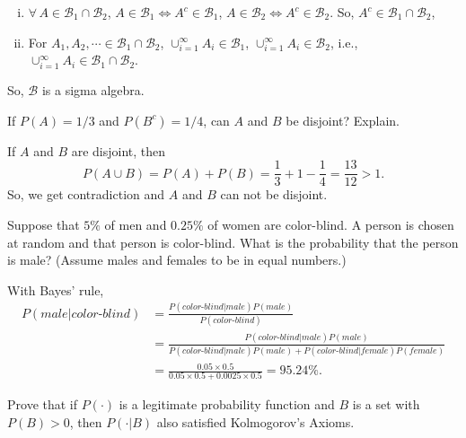 \documentclass[14pt]{elegantbook}
\begin{document}
\begin{solution}
\begin{enumerate}[(a)]
\begin{enumerate}[(i)]
                \item $\forall\,A\in\mathcal{B}_1\cap\mathcal{B}_2$, $A\in\mathcal{B}_1\Leftrightarrow A^c\in\mathcal{B}_1$, $A\in\mathcal{B}_2\Leftrightarrow A^c\in\mathcal{B}_2$. So, $A^c\in\mathcal{B}_1\cap\mathcal{B}_2$, 
                \item For $A_1, A_2, \cdots \in\mathcal{B}_1\cap\mathcal{B}_2$, $\cup_{i=1}^\infty A_i\in\mathcal{B}_1$, $\cup_{i=1}^\infty A_i\in\mathcal{B}_2$, i.e., $\cup_{i=1}^\infty A_i\in\mathcal{B}_1\cap\mathcal{B}_2$. 
            \end{enumerate}
            So, $\mathcal{B}$ is a sigma algebra. 
        \end{enumerate}
    \end{solution}

    \setcounter{exer}{12}
    \begin{exercise}
        If $P(A)=1/3$ and $P(B^c)=1/4$, can $A$ and $B$ be disjoint? Explain. 
    \end{exercise}

    \begin{solution}
        If $A$ and $B$ are disjoint, then
        \[P(A\cup B)=P(A)+P(B)=\frac{1}{3}+1-\frac{1}{4}=\frac{13}{12}>1. \]
        So, we get contradiction and $A$ and $B$ can not be disjoint. 
    \end{solution}

    \setcounter{exer}{32}
    \begin{exercise}
        Suppose that $5\%$ of men and $0.25\%$ of women are color-blind. A person is chosen at random and that person is color-blind. What is the probability that the person is male? (Assume males and females to be in equal numbers.)
    \end{exercise}

    \begin{solution}
        With Bayes' rule, 
        \begin{align*}
            P(male|color\text{-}blind)&=\frac{P(color\text{-}blind|male)P(male)}{P(color\text{-}blind)}\\
            &=\frac{P(color\text{-}blind|male)P(male)}{P(color\text{-}blind|male)P(male)+P(color\text{-}blind|female)P(female)}\\
            &=\frac{0.05\times0.5}{0.05\times0.5+0.0025\times0.5}=95.24\%.
        \end{align*}
    \end{solution}

    \setcounter{exer}{34}
    \begin{exercise}
        Prove that if $P(\cdot)$ is a legitimate probability function and $B$ is a set with $P(B)>0$, then $P(\cdot|B)$ also satisfied Kolmogorov's Axioms. 
    \end{exercise}
\end{document}
